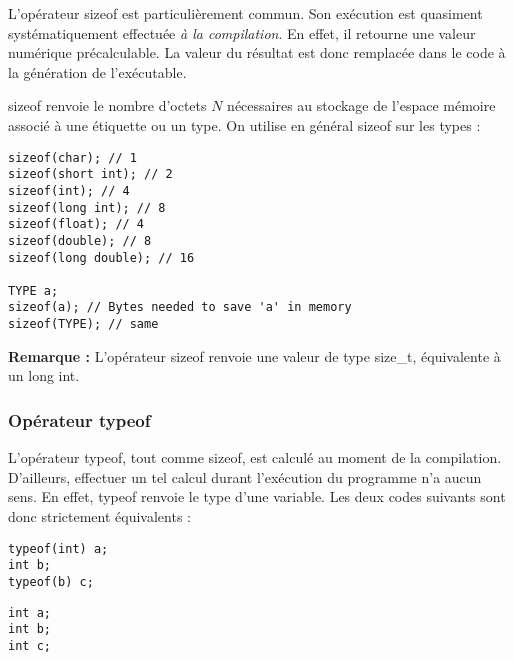 \documentclass[../../../main.tex]{subfiles}
\begin{document}
L'opérateur \textsf{sizeof} est particulièrement commun. Son exécution est quasiment systématiquement effectuée \textit{à la compilation}. En effet, il retourne une valeur numérique précalculable. La valeur du résultat est donc remplacée dans le code à la génération de l'exécutable.
 
\textsf{sizeof} renvoie le nombre d'octets $N$ nécessaires au stockage de l'espace mémoire associé à une étiquette ou un type. On utilise en général \textsf{sizeof} sur les types :
\begin{verbatim}
sizeof(char); // 1
sizeof(short int); // 2
sizeof(int); // 4
sizeof(long int); // 8
sizeof(float); // 4
sizeof(double); // 8
sizeof(long double); // 16

TYPE a;
sizeof(a); // Bytes needed to save 'a' in memory
sizeof(TYPE); // same
\end{verbatim}
\textbf{Remarque :} L'opérateur \textsf{sizeof} renvoie une valeur de type \textsf{size\_t}, équivalente à un \textsf{long int}.

\subsubsection{Opérateur \textsf{typeof}}
L'opérateur \textsf{typeof}, tout comme \textsf{sizeof}, est calculé au moment de la compilation. D'ailleurs, effectuer un tel calcul durant l'exécution du programme n'a aucun sens. En effet, \textsf{typeof} renvoie le type d'une variable. Les deux codes suivants sont donc strictement équivalents : 

\begin{minipage}{0.5\textwidth}
\begin{verbatim}
typeof(int) a;
int b;
typeof(b) c;
\end{verbatim}
\end{minipage}
\begin{minipage}{0.5\textwidth}
\begin{verbatim}
int a;
int b;
int c;
\end{verbatim}
\end{minipage}
\end{document}
